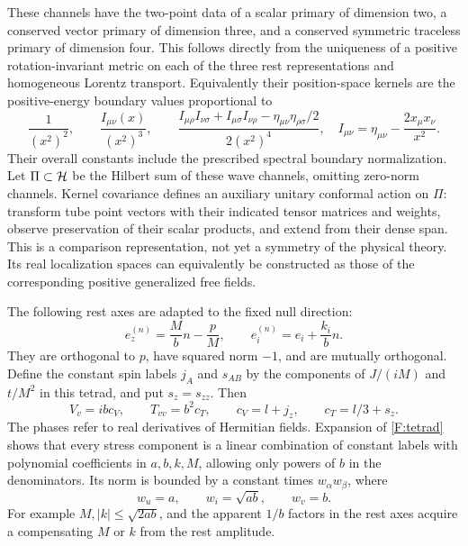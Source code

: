 These channels have the two-point data of a scalar primary of dimension
two, a conserved vector primary of dimension three, and a conserved
symmetric traceless primary of dimension four. This follows directly
from the uniqueness of a positive rotation-invariant metric on each of
the three rest representations and homogeneous Lorentz transport.
Equivalently their position-space kernels are the positive-energy
boundary values proportional to
\[
 \frac1{(x^2)^2},\qquad
 \frac{I_{\mu\nu}(x)}{(x^2)^3},\qquad
 \frac{I_{\mu\rho}I_{\nu\sigma}+I_{\mu\sigma}I_{\nu\rho}
                 -\eta_{\mu\nu}\eta_{\rho\sigma}/2}{2(x^2)^4},
 \quad I_{\mu\nu}=\eta_{\mu\nu}-\frac{2x_\mu x_\nu}{x^2}.
\]
Their overall constants include the prescribed spectral boundary
normalization. Let $\Pi\subset\mathcal H$ be the Hilbert sum of these wave
channels, omitting zero-norm channels. Kernel covariance defines an
auxiliary unitary conformal action on $\Pi$: transform tube point vectors
with their indicated tensor matrices and weights, observe preservation
of their scalar products, and extend from their dense span. This is a
comparison representation, not yet a symmetry of the physical theory.
Its real localization spaces can equivalently be constructed as those
of the corresponding positive generalized free fields.

The following rest axes are adapted to the fixed null direction:
\begin{equation}\label{F:tetrad}
 e_z^{(n)}=\frac{M}{b}n-\frac pM,\qquad
 e_i^{(n)}=e_i+\frac{k_i}{b}n.
\end{equation}
They are orthogonal to $p$, have squared norm $-1$, and are mutually
orthogonal. Define the constant spin labels $j_A$ and $s_{AB}$ by the
components of $J/(iM)$ and $t/M^2$ in this tetrad, and put $s_z=s_{zz}$.
Then
\begin{equation}\label{F:longitudinal-labels}
 V_v=ibc_V,\qquad T_{vv}=b^2c_T,\qquad
 c_V=l+j_z,\qquad c_T=l/3+s_z.
\end{equation}
The phases refer to real derivatives of Hermitian fields. Expansion of
\eqref{F:tetrad} shows that every stress component is a linear combination
of constant labels with polynomial coefficients in $a,b,k,M$, allowing
only powers of $b$ in the denominators. Its norm is bounded by a constant
times $w_\alpha w_\beta$, where
\begin{equation}\label{F:component-weights}
 w_u=a,\qquad w_i=\sqrt{ab},\qquad w_v=b.
\end{equation}
For example $M,|k|\le\sqrt{2ab}$, and the apparent $1/b$ factors in the
rest axes acquire a compensating $M$ or $k$ from the rest amplitude.

